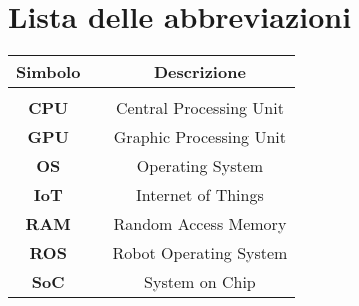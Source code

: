 

\fancyhf{}
\thispagestyle{plain}

\chapter[Lista delle abbreviazioni]{\centering Lista delle abbreviazioni}
\fontsize{14}{14}\selectfont

\begin{center}
\centering
\setlength{\tabcolsep}{15pt}
\fontsize{14}{14}\selectfont
\begin{tabular}{ c c c }
\multicolumn{1}{c}{\Large \textbf{Simbolo}} & & \multicolumn{1}{c}{\Large \textbf{Descrizione}}\\
\hline\hline\\

\textbf{CPU} & & Central Processing Unit\\
\textbf{GPU} & & Graphic Processing Unit\\
\textbf{OS}  & & Operating System\\
\textbf{IoT} & & Internet of Things\\
\textbf{RAM} & & Random Access Memory\\
\textbf{ROS} & & Robot Operating System\\
\textbf{SoC} & & System on Chip\\

\end{tabular}
\end{center}

\restoregeometry
